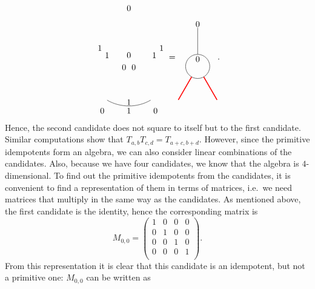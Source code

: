 \begin{equation*}
\begin{tikzpicture}[scale=1,baseline=(current bounding box.center)]
			\draw ([shift=(-120:1.8cm)]0,0) arc (-120:-60:1.8cm);
			\node at (90:.3cm){$0$};\node at (90:2.25cm){$0$};
			\node at (0.2,-0.2) {$0$};
			\node at (-0.2,-0.2) {$0$};
			\node at (-1.1,-2) {$0$};
			\node at (1.1,-2) {$0$};
			\node at (-0.9,0.3) {$1$};
			\node at (1.05,0.3) {$1$};
			\node at (0,-1.65) {$1$};
			\node at (-1.2,0.6) {$1$};
			\node at (1.35,0.6) {$1$};
			\node at (0,-2) {$1$};
		\end{tikzpicture}
		=\begin{tikzpicture}[scale=1,baseline=(current bounding box.center)]
			\draw (0,0) circle (0.5cm);
			\draw[red,line width=0.4mm]
			\foreach \a in {-60, -120} {
				(\a:0.5) -- (\a:1.6)
			};
			\draw[] (90:0.5) -- (90:1.6);
			\node at (90:.3cm){$0$};\node at (90:1.75cm){$0$};
		\end{tikzpicture}\vspace{5pt}.
	\end{equation*}
Hence, the second candidate does not square to itself but to the first candidate. 
Similar computations show that $T_{a,b}T_{c,d}=T_{a+c,b+d}$. 
However, since the primitive idempotents form an algebra, we can also consider linear combinations of the candidates. Also, because we have four candidates, we know that the algebra is $4$-dimensional. To find out the primitive idempotents from the candidates, it is convenient to find a representation of them in terms of matrices, i.e.\ we need matrices that multiply in the same way as the candidates. As mentioned above, the first candidate is the identity, hence the corresponding matrix is
	\begin{equation}
		M_{0,0}=\begin{pmatrix}
			1 & 0 & 0 & 0\\
			0 & 1 & 0 & 0\\
			0 & 0 & 1 & 0\\
			0 & 0 & 0 & 1\\
		\end{pmatrix}.
	\end{equation}
From this representation it is clear that this candidate is an idempotent, but not a primitive one: $M_{0,0}$ can be written as
